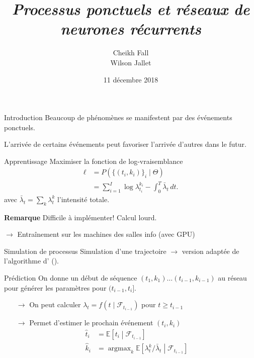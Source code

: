 \documentclass{beamer}
\title{
	\textit{Processus ponctuels et réseaux de neurones récurrents}
}
\author{Cheikh Fall\\Wilson Jallet}
\date{11 décembre 2018}
\newcommand{\EE}{\mathbb{E}}
\DeclareMathOperator*{\argmax}{argmax} %
\begin{document}
\maketitle

\begin{frame}{Introduction}
Beaucoup de phénomènes se manifestent par des événements ponctuels.\pause

L'arrivée de certains événements peut favoriser l'arrivée d'autres dans le futur.
\end{frame}



\begin{frame}{Apprentissage}
Maximiser la fonction de log-vraisemblance
\begin{equation}\label{eq:logLikelihood}
\begin{aligned}
\ell &= P\left( \{(t_i,k_i)\}_i \mid \Theta \right) \\
&= \sum_{i=1}^{I}\log \lambda^{k_i}_{t_i} - \int_0^T \bar{\lambda}_t\,dt.
\end{aligned}
\end{equation}
avec $\bar{\lambda}_t = \sum_k \lambda^k_t$ l'intensité totale.

\textbf{Remarque} Difficile à implémenter! Calcul lourd.

$\rightarrow$ Entraînement sur les machines des salles info (avec GPU)
\end{frame}


\begin{frame}{Simulation de processus}
Simulation d'une trajectoire $\rightarrow$ version adaptée de l'algorithme d'\citeauthor{ogata1981} (\citeyear{ogata1981}).
\end{frame}

\begin{frame}{Prédiction}
On donne un début de séquence $(t_1,k_1)\ldots (t_{i-1}, k_{i-1})$ au réseau pour générer les paramètres pour $(t_{i-1}, t_i]$.
\begin{itemize}
	\item[$\rightarrow$] On peut calculer $\lambda_t = f(t\mid\mathcal{F}_{t_{i-1}})$ pour $t\geq t_{i-1}$
	\item[$\rightarrow$] Permet d'estimer le prochain événement $(t_i, k_i)$
	\[
	\begin{aligned}
		\hat{t}_i &= \EE\left[t_i \middle| \mathcal{F}_{t_{i-1}}\right] \\
		\hat{k}_i &= \argmax_{k}\EE\left[\lambda^k_t/\bar{\lambda}_t\middle| \mathcal{F}_{t_{i-1}} \right]
	\end{aligned}
	\]
\end{itemize}
\end{frame}
\end{document}
